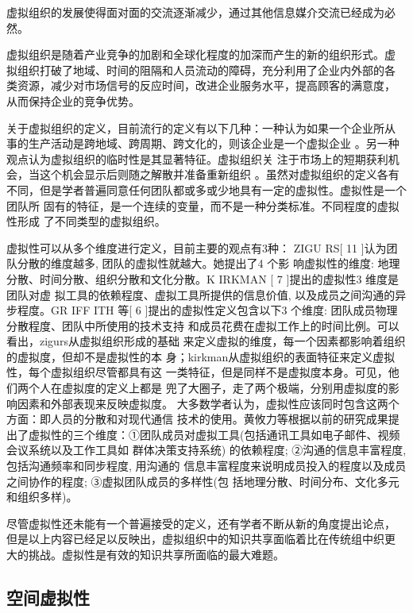 \documentclass[12pt,a4paper]{ctexart}
\begin{document}
虚拟组织的发展使得面对面的交流逐渐减少，通过其他信息媒介交流已经成为必
然。

虚拟组织是随着产业竞争的加剧和全球化程度的加深而产生的新的组织形式。虚
拟组织打破了地域、时间的阻隔和人员流动的障碍，充分利用了企业内外部的各
类资源，减少对市场信号的反应时间，改进企业服务水平，提高顾客的满意度，
从而保持企业的竞争优势。

关于虚拟组织的定义，目前流行的定义有以下几种：一种认为如果一个企业所从
事的生产活动是跨地域、跨周期、跨文化的，则该企业是一个虚拟企业
\cite{1189855}。另一种观点认为虚拟组织的临时性是其显著特征。虚拟组织关
注于市场上的短期获利机会，当这个机会显示后则随之解散并准备重新组织
\cite{655269}。虽然对虚拟组织的定义各有不同，但是学者普遍同意任何团队都或多或少地具有一定的虚拟性。虚拟性是一个团队所
固有的特征，是一个连续的变量，而不是一种分类标准。不同程度的虚拟性形成
了不同类型的虚拟组织。

虚拟性可以从多个维度进行定义，目前主要的观点有3种：
ZIGU RS[ 11 ]认为团队分散的维度越多, 团队的虚拟性就越大。她提出了4 个影
响虚拟性的维度:
地理分散、时间分散、组织分散和文化分散。K IRKMAN [ 7 ]提出的虚拟性3 维度是团队对虚
拟工具的依赖程度、虚拟工具所提供的信息价值, 以及成员之间沟通的异步程度。GR IFF ITH
等[ 6 ]提出的虚拟性定义包含以下3 个维度: 团队成员物理分散程度、团队中所使用的技术支持
和成员花费在虚拟工作上的时间比例。可以看出，zigurs从虚拟组织形成的基础
来定义虚拟的维度，每一个因素都影响着组织的虚拟度，但却不是虚拟性的本
身；kirkman从虚拟组织的表面特征来定义虚拟性，每个虚拟组织尽管都具有这
一类特征，但是同样不是虚拟度本身。可见，他们两个人在虚拟度的定义上都是
兜了大圈子，走了两个极端，分别用虚拟度的影响因素和外部表现来反映虚拟度。
大多数学者认为，虚拟性应该同时包含这两个方面：即人员的分散和对现代通信
技术的使用。黄攸力等\cite{huangyouliandliutuanjie}根据以前的研究成果提
出了虚拟性的三个维度：①团队成员对虚拟工具(包括通讯工具如电子邮件、视频会议系统以及工作工具如
群体决策支持系统) 的依赖程度; ②沟通的信息丰富程度, 包括沟通频率和同步程度, 用沟通的
信息丰富程度来说明成员投入的程度以及成员之间协作的程度; ③虚拟团队成员的多样性(包
括地理分散、时间分布、文化多元和组织多样)。

尽管虚拟性还未能有一个普遍接受的定义，还有学者不断从新的角度提出论点，
但是以上内容已经足以反映出，虚拟组织中的知识共享面临着比在传统组中织更
大的挑战。虚拟性是有效的知识共享所面临的最大难题。

\subsection{空间虚拟性}
\end{document}
